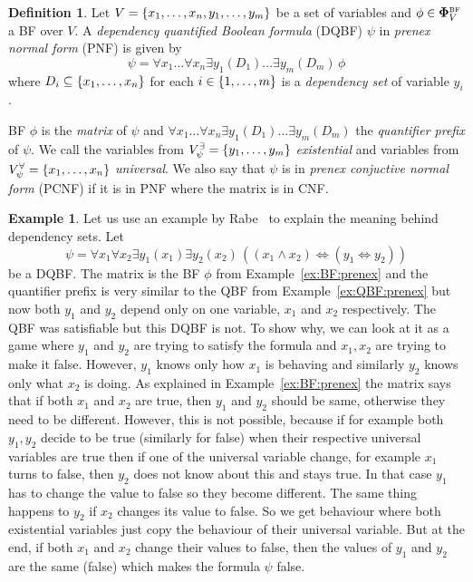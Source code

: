 \documentclass[
  digital, %
  twoside, %
  table,   %
  nolof,     %
  nolot,     %
]{fithesis3}
\let\setbuilder\set
\newcommand{\simpleset}[1]{\{{#1}\}}
\renewcommand{\set}[1]{\normalexpandarg\IfSubStr{#1}{|}{\setbuilder{#1}}{\simpleset{#1}}}
\theoremstyle{definition}
\newtheorem{definition}{Definition}
\newtheorem{example}{Example}
\theoremstyle{remark}
\newcommand{\BF}[1]{\mathbf{\Phi}_{#1}^{\normalfont{\text{\tiny BF}}}}
\newcommand{\evars}[1]{V_{#1}^{\exists}}
\newcommand{\uvars}[1]{V_{#1}^{\forall}}
\newcommand{\lequal}{\Leftrightarrow}
\newcommand{\itholds}{\,}
\begin{document}
\begin{definition}
  Let $V = \set{x_1, \dots, x_n, y_1, \dots, y_m}$ be a set of variables and $\phi \in \BF{V}$ a BF over $V$. A \emph{dependency quantified Boolean formula} (DQBF) $\psi$ in \emph{prenex normal form} (PNF) is given by
  \[\psi = \forall x_1 \dots \forall x_n \exists y_1 (D_1) \dots \exists y_m (D_m) \itholds \phi\]
  where $D_i \subseteq \set{x_1, \dots, x_n}$ for each $i \in \set{1,\dots,m}$ is a \emph{dependency set} of variable $y_i$.
  \label{def:DQBF:PNF}
\end{definition}
BF $\phi$ is the \emph{matrix} of $\psi$ and $\forall x_1 \dots \forall x_n \exists y_1 (D_1) \dots \exists y_m (D_m)$ the \emph{quantifier prefix} of $\psi$. We call the variables from $\evars{\psi} = \set{y_1,\dots,y_m}$ \emph{existential} and variables from $\uvars{\psi} = \set{x_1,\dots,x_n}$ \emph{universal}. We also say that $\psi$ is in \emph{prenex conjuctive normal form} (PCNF) if it is in PNF where the matrix is in CNF.



\begin{example}
Let us use an example by Rabe~\cite{DQBFProofSystem} to explain the meaning behind dependency sets. Let 
\[\psi = \forall x_1 \forall x_2 \exists y_1 (x_1) \exists y_2 (x_2) \itholds ((x_1 \land x_2) \lequal (y_1 \lequal y_2))\]
be a DQBF. The matrix is the BF $\phi$ from Example~\ref{ex:BF:prenex} and the quantifier prefix is very similar to the QBF from Example~\ref{ex:QBF:prenex} but now both $y_1$ and $y_2$ depend only on one variable, $x_1$ and $x_2$ respectively. The QBF was satisfiable but this DQBF is not. To show why, we can look at it as a game where $y_1$  and $y_2$ are trying to satisfy the formula and $x_1,x_2$ are trying to make it false. However, $y_1$ knows only how $x_1$ is behaving and similarly $y_2$ knows only what $x_2$ is doing. As explained in Example~\ref{ex:BF:prenex} the matrix says that if both $x_1$ and $x_2$ are true, then $y_1$ and $y_2$ should be same, otherwise they need to be different. However, this is not possible, because if for example both $y_1,y_2$ decide to be true (similarly for false) when their respective universal variables are true then if one of the universal variable change, for example $x_1$ turns to false, then $y_2$ does not know about this and stays true. In that case $y_1$ has to change the value to false so they become different. The same thing happens to $y_2$ if $x_2$ changes its value to false. So we get behaviour where both existential variables just copy the behaviour of their universal variable. But at the end, if both $x_1$ and $x_2$ change their values to false, then the values of $y_1$ and $y_2$ are the same (false) which makes the formula $\psi$ false.
\end{example}
\end{document}
